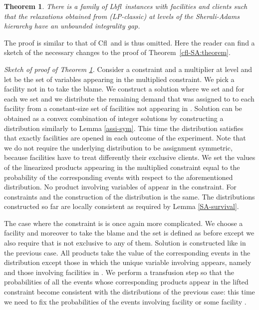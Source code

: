 \documentclass[11pt]{article}
\newtheorem{theorem}{Theorem}[section]
\newcommand{\lbfl}{{\sc Lbfl}}
\newcommand{\cfl}{{\sc Cfl}}
\begin{document}
\begin{theorem}\label{lbfl-SA:theorem}
There is  a family of  \lbfl\   instances with  facilities and  clients  
such that the  relaxations  obtained from (LP-classic)  at 
levels of  the Sherali-Adams hierarchy have an unbounded integrality
gap. 
\end{theorem}

The proof  is similar to  that of \cfl\  and is thus omitted.  Here the
reader can  find a  sketch of  the necessary changes  to the  proof of
Theorem~\ref{cfl-SA:theorem}.

\vspace*{0.2cm}
\noindent
{\em Sketch of proof of Theorem \ref{lbfl-SA:theorem}.}
Consider a constraint  and
a  multiplier   at  level   and  let   be  the set  of
variables appearing in the  multiplied constraint.  We pick a facility
 not  in   to take the  blame. We construct  a solution
 where we set  and for each  we  set   and  we
distribute the remaining demand that was assigned to  to each
facility from a constant-size set  of facilities  not appearing in
. Solution   can be obtained as a  convex combination of
integer solutions  by constructing  a distribution similarly  to Lemma
\ref{assi-sym}. This time the distribution satisfies 
 that exactly   facilities are opened in
each  outcome of the  experiment. Note that we do not require the 
underlying distribution to be assignment symmetric, 
because facilities have to treat differently their exclusive clients. 
We  set the  
values of  the linearized products appearing in the multiplied constraint
equal to  the probability of the  corresponding events with respect  
to the aforementioned  distribution. No product involving variables of 
 appear in the constraint.  For  constraints 
  and  the  construction 
of the  distribution is the  same. The distributions constructed so far
 are locally consistent as required by Lemma \ref{SA-survival}.

The case where the constraint is  is once
again  more complicated.   We choose  a  facility   and
moreover  to  take the blame and the set
 is  defined as before except  we also require  that  is
not exclusive to any of them. Solution  is constructed like in the
previous case. All products take the value of the corresponding events
in the  distribution except those in which the  unique variable involving
  appears, namely   and  those involving  facilities in
. We perform a transfusion  step so that the probabilities of all
the  events   whose  corresponding  products  appear   in  the  lifted
constraint become consistent with the distributions of the previous
case:  this  time we  need  to fix  the  probabilities  of the  events
involving facility  or some facility .
\end{document}
